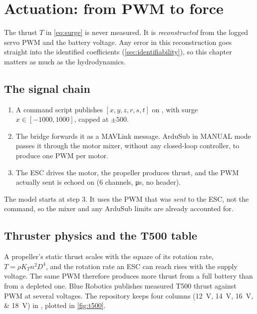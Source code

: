 \chapter{Actuation: from PWM to force}
\label{ch:actuation}

The thrust $T$ in \eqref{eq:surge} is never measured. It is \emph{reconstructed} from the
logged servo PWM and the battery voltage. Any error in this reconstruction goes straight
into the identified coefficients (\cref{sec:identifiability}), so this chapter matters as much
as the hydrodynamics.

\section{The signal chain}

\begin{enumerate}
  \item A command script publishes  $[x, y, z, r, s, t]$ on
        , with surge $x\in[-1000, 1000]$, capped at $\pm500$.
  \item The bridge forwards it as a MAVLink  message. ArduSub in MANUAL mode passes it
        through the motor mixer, without any closed-loop controller, to produce one PWM per motor.
  \item The ESC drives the motor, the propeller produces thrust, and the PWM actually sent is
        echoed on  (6 channels, \unit{\micro\second}, no header).
\end{enumerate}
The model starts at step 3. It uses the PWM that was \emph{sent} to the ESC, not the command,
so the mixer and any ArduSub limits are already accounted for.

\section{Thruster physics and the T500 table}

A propeller's static thrust scales with the square of its rotation rate,
$T = \rho K_T n^2 D^4$, and the rotation rate an ESC can reach rises with the supply voltage.
The same PWM therefore produces more thrust from a full battery than from a depleted one.
Blue Robotics publishes measured T500 thrust against PWM at several voltages. The repository
keeps four columns (\SIlist{12;14;16;18}{\volt}) in ,
plotted in \cref{fig:t500}.

